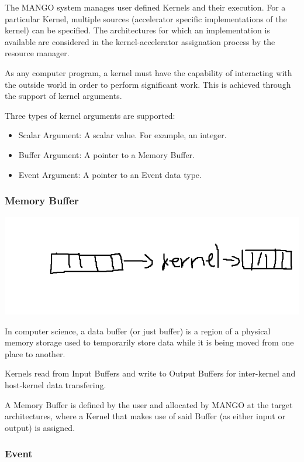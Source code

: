 The MANGO system manages user defined Kernels and their execution. For a particular Kernel, multiple sources (accelerator specific implementations of the kernel) can be specified. The architectures for which an implementation is available are considered in the kernel-accelerator assignation process by the resource manager. 

As any computer program, a kernel must have the capability of interacting with the outside world in order to perform significant work. This is achieved through the support of kernel arguments.

Three types of kernel arguments are supported: 
\begin{itemize}
    \item Scalar Argument: A scalar value. For example, an integer.
    \item Buffer Argument: A pointer to a Memory Buffer.
    \item Event Argument: A pointer to an Event data type.
\end{itemize}

\subsubsection{Memory Buffer}
\includegraphics[scale=0.5]{img/kernel_buffer.png}

In computer science, a data buffer (or just buffer) is a region of a physical memory storage used to temporarily store data while it is being moved from one place to another. \cite{buffer_wikipedia}

Kernels read from Input Buffers and write to Output Buffers for inter-kernel and host-kernel data transfering.

A Memory Buffer is defined by the user and allocated by MANGO at the target architectures, where a Kernel that makes use of said Buffer (as either input or output) is assigned.

\subsubsection{Event}


